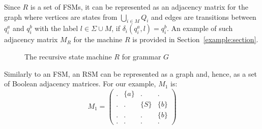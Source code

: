 Since $R$ is a set of FSMs, it can be represented as an adjacency matrix for the graph where vertices are states from $\bigcup_{i \in M}Q_i$ and edges are transitions between $q_i^a$ and $q_i^b$ with the label $l \in \Sigma \cup M$, if $\delta_i (q_i^a, l) = q_i^b$.
An example of such adjacency matrix $M_R$ for the machine $R$ is provided in Section~\ref{example:section}.

\begin{figure}[h]
    \centering
    \caption{The recursive state machine $R$ for grammar $G$}
    \label{example:automata}
\end{figure}

Similarly to an FSM, an RSM can be represented as a graph and, hence, as a set of Boolean adjacency matrices.
For our example, $M_1$ is:
    $$
    M_1 =
    \begin{pmatrix}
    . & \{a\} &  . & .     \\
    . & . & \{S\} & \{b\} \\
    . & . & . & \{b\}     \\
    . & . & . & .
    \end{pmatrix}
    $$

